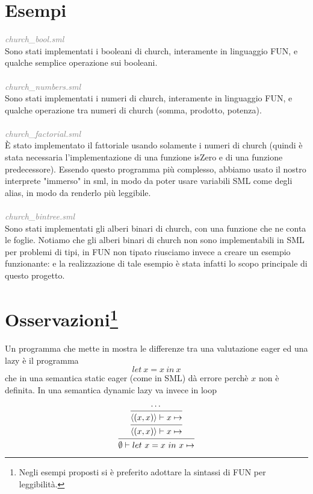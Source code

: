 \documentclass[a4paper]{article}
\begin{document}
	\section{Esempi}
	\textit{\textcolor{gray}{church\_bool.sml}} \\
	Sono stati implementati i booleani di church, interamente in linguaggio FUN, e qualche semplice operazione sui booleani.\\ \\
	\textit{\textcolor{gray}{church\_numbers.sml}} \\
	Sono stati implementati i numeri di church, interamente in linguaggio FUN, e qualche operazione tra numeri di church (somma, prodotto, potenza).\\ \\
	\textit{\textcolor{gray}{church\_factorial.sml}} \\
	È stato implementato il fattoriale usando solamente i numeri di church (quindi è stata necessaria l'implementazione di una funzione isZero e di una funzione predecessore). Essendo questo programma più complesso, abbiamo usato il nostro interprete "immerso" in sml, in modo da poter usare variabili SML come degli alias, in modo da renderlo più leggibile. \\ \\
	\textit{\textcolor{gray}{church\_bintree.sml}} \\
	Sono stati implementati gli alberi binari di church, con una funzione che ne conta le foglie. Notiamo che gli alberi binari di church non sono implementabili in SML per problemi di tipi, in FUN non tipato riusciamo invece a creare un esempio funzionante: e la realizzazione di tale esempio è stata infatti lo scopo principale di questo progetto.

	\section[Osservazioni]{Osservazioni\footnote{Negli esempi proposti si è preferito adottare la sintassi di FUN per leggibilità.}}
	Un programma che mette in mostra le differenze tra una valutazione eager ed una lazy è il programma 
	\[ let \ x = x \ in \ x \]
	che in una semantica static eager (come in SML) dà errore perchè $x$ non è definita. In una semantica dynamic lazy va invece in loop

	\begin{figure}[ht]
	\[
		\begin{prooftree}
			\hypo{\cdots}
			\infer1[]{\langle (x,x) \rangle \vdash x \mapsto }
			\infer1[]{\langle (x,x) \rangle \vdash x \mapsto }
			\infer1[]{\emptyset \vdash let \ x=x \ in \ x \mapsto }
		\end{prooftree}
	\]
	\end{figure}
\end{document}
